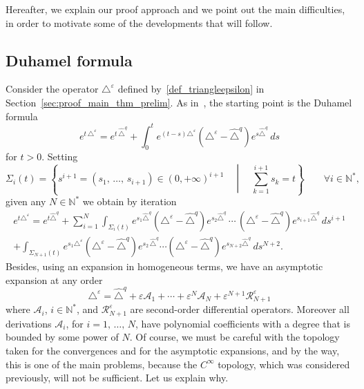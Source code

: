 \documentclass[10pt]{amsart}
\theoremstyle{definition}\newtheorem{defi}[theo]{Definition}\newtheorem{rema}[theo]{Remark}\newtheorem{exam}[theo]{Example}\newtheorem{exem}[theo]{Example}\newtheorem{nota}[theo]{Notation}
\newcommand*\N{\mathbb{N}}
\newcommand{\calA}{\mathcal{A}}
\newcommand{\calR}{\mathcal{R}}
\let\oldforall\forall
\renewcommand*{\forall}{\mathrel{\oldforall}}
\begin{document}
Hereafter, we explain our proof approach and we point out the main difficulties, in order to motivate some of the developments that will follow.

\subsection{Duhamel formula}\label{sec_duh}
Consider the operator $\triangle^\varepsilon$ defined by~\eqref{def_triangleepsilon} in Section~\ref{sec:proof_main_thm_prelim}. As in~\cite{Ba-13}, the starting point is the Duhamel formula
\[
e^{t\,\triangle^\varepsilon} = e^{t\,\widehat{\triangle}^{q}} + \int_0^t e^{(t-s)\triangle^\varepsilon}\left(\triangle^\varepsilon-\widehat{\triangle}^{q}\right)e^{s \widehat{\triangle}^{q}}\, ds
\]
for $t>0$. Setting
\[
\Sigma_i(t) = \left\{ s^{i+1} = (s_1,\,\ldots,\,s_{i+1})\in(0,+\infty)^{i+1}\quad \middle|\quad \sum_{k=1}^{i+1} s_k = t \right\} \qquad \forall i\in\N^*,
\]
given any $N\in\N^*$ we obtain by iteration
\begin{multline}\label{rough_duh1}
e^{t\triangle^{\varepsilon}} = e^{t \widehat{\triangle}^{q}} + \sum_{i=1}^N \int_{\Sigma_i(t)} e^{s_1 \widehat{\triangle}^{q}} \left(\triangle^{\varepsilon} - \widehat{\triangle}^{q}\right) e^{s_2 \widehat{\triangle}^{q}}\,\cdots\,\left(\triangle^{\varepsilon} - \widehat{\triangle}^{q}\right) e^{s_{i+1} \widehat{\triangle}^{q}} \, ds^{i+1} \\
+ \int_{\Sigma_{N+1}(t)} e^{s_1 \triangle^\varepsilon} \left(\triangle^{\varepsilon} - \widehat{\triangle}^{q}\right) e^{s_2 \,\widehat{\triangle}^{q}} \cdots \left(\triangle^{\varepsilon} - \widehat{\triangle}^{q}\right) e^{s_{N+2} \widehat{\triangle}^{q}} \, ds^{N+2}.
\end{multline}
Besides, using an expansion in homogeneous terms, we have an asymptotic expansion at any order
\begin{equation}\label{expansionaaa}
\triangle^\varepsilon = \widehat{\triangle}^{q} + \varepsilon \calA_1 + \cdots + \varepsilon^N\calA_N + \varepsilon^{N+1}\calR_{N+1}^\varepsilon
\end{equation}
where $\calA_i$, $i\in\N^*$, and $\calR_{N+1}^\varepsilon$ are second-order differential operators. Moreover all derivations $\calA_i$, for $i=1,\,\ldots,\,N$, have polynomial coefficients with a degree that is bounded by some power of $N$. Of course, we must be careful with the topology taken for the convergences and for the asymptotic expansions, and by the way, this is one of the main problems, because the $C^\infty$ topology, which was considered previously, will not be sufficient. Let us explain why.
\end{document}
